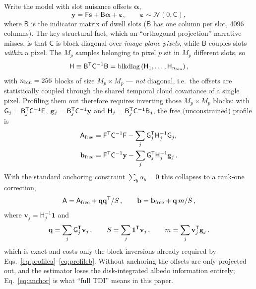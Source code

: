 \documentclass[twocolumn,10pt]{article}
\begin{document}
Write the model with slot nuisance offsets $\boldsymbol\alpha$,
\begin{equation}
\mathbf{y}=\mathsf{F}\mathbf{s}+\mathsf{B}\boldsymbol\alpha+\boldsymbol\varepsilon,
\qquad \boldsymbol\varepsilon\sim\mathcal N(0,\mathsf{C}),
\label{eq:nuisance}
\end{equation}
where $\mathsf{B}$ is the indicator matrix of dwell slots ($\mathsf{B}$ has one
column per slot, 4096 columns). The key structural fact, which an
``orthogonal projection'' narrative misses, is that $\mathsf{C}$ is block
diagonal over \emph{image-plane pixels}, while $\mathsf{B}$ couples slots
\emph{within} a pixel. The $M_p$ samples belonging to pixel $p$ sit in $M_p$
different slots, so
\begin{equation}
\mathsf{H}\equiv\mathsf{B}^{\sf T}\mathsf{C}^{-1}\mathsf{B}
=\mathrm{blkdiag}\left(\mathsf{H}_1,\ldots,\mathsf{H}_{n_{\rm bin}}\right),
\label{eq:H}
\end{equation}
with $n_{\rm bin}=256$ blocks of size $M_p\times M_p$ --- \emph{not}
diagonal, i.e.\ the offsets are statistically coupled through
the shared temporal cloud covariance of a single pixel. Profiling them out
therefore requires inverting those $M_p\times M_p$ blocks: with
$\mathsf{G}_j=\mathsf{B}_j^{\sf T}\mathsf{C}^{-1}\mathsf{F}$,
$\mathbf{g}_j=\mathsf{B}_j^{\sf T}\mathsf{C}^{-1}\mathbf{y}$ and
$\mathsf{H}_j=\mathsf{B}_j^{\sf T}\mathsf{C}^{-1}\mathsf{B}_j$, the free
(unconstrained) profile is
\begin{align}
\mathsf{A}_{\rm free}&=\mathsf{F}^{\sf T}\mathsf{C}^{-1}\mathsf{F}
-\sum_j \mathsf{G}_j^{\sf T}\mathsf{H}_j^{-1}\mathsf{G}_j,
\label{eq:profilea}\\
\mathbf{b}_{\rm free}&=\mathsf{F}^{\sf T}\mathsf{C}^{-1}\mathbf{y}
-\sum_j \mathsf{G}_j^{\sf T}\mathsf{H}_j^{-1}\mathbf{g}_j\,.
\label{eq:profileb}
\end{align}
With the standard anchoring constraint $\sum_b\alpha_b=0$ this collapses
to a rank-one correction,
\begin{equation}
\mathsf{A}=\mathsf{A}_{\rm free}+\mathbf{q}\mathbf{q}^{\sf T}/S\,,\qquad
\mathbf{b}=\mathbf{b}_{\rm free}+\mathbf{q}\,m/S\,,
\label{eq:anchor}
\end{equation}
where $\mathbf{v}_j=\mathsf{H}_j^{-1}\mathbf{1}$ and
\begin{equation}
\mathbf{q}=\sum_j\mathsf{G}_j^{\sf T}\mathbf{v}_j\,,\qquad
S=\sum_j\mathbf{1}^{\sf T}\mathbf{v}_j\,,\qquad
m=\sum_j\mathbf{v}_j^{\sf T}\mathbf{g}_j\,.
\label{eq:anchordef}
\end{equation}
which is exact and costs only the block inversions already required by
Eqs.~\ref{eq:profilea}--\ref{eq:profileb}. Without anchoring the offsets are only
projected out, and the estimator loses the disk-integrated albedo information
entirely; Eq.~\ref{eq:anchor} is what ``full TDI'' means in this paper.
\end{document}
